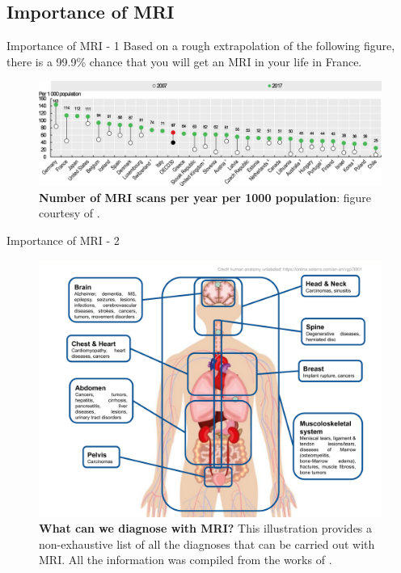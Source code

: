 \subsection{Importance of MRI}
\begin{frame}{Importance of MRI - 1}
    Based on a rough extrapolation of the following figure, there is a 99.9\% chance that you will get an MRI in your life in France.
    \begin{figure}
        \centering
        \includegraphics[width=\textwidth]{Figures/intro_figures/num_mri_scans.png}
        \caption{\label{fig:num-mri-scans} \textbf{Number of MRI scans per year per 1000 population}: figure courtesy of \citet{OECDMRI}.}
    \end{figure}
\end{frame}

\begin{frame}{Importance of MRI - 2}
    \begin{figure}
        \centering
        \includegraphics[height=0.6\textheight]{Figures/intro_figures/What_can_we_diagnose_with_MRI.pdf}
        \caption{\label{fig:diagnose-mri} \textbf{What can we diagnose with MRI?} This illustration provides a non-exhaustive list of all the diagnoses that can be carried out with MRI. All the information was compiled from the works of \citet{reimer2010clinical,runge2019essentials}.}
    \end{figure}
\end{frame}

